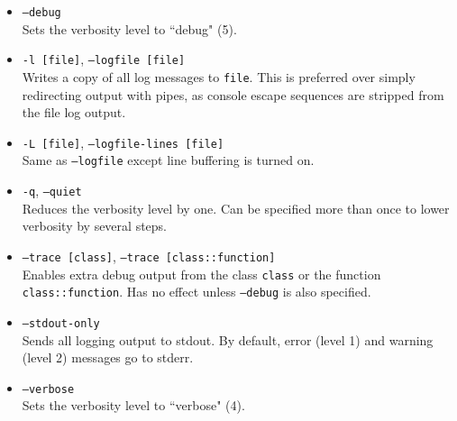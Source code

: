 \begin{itemize}

\item \texttt{--debug}\\
Sets the verbosity level to ``debug" (5).

\item \texttt{-l [file]}, \texttt{--logfile [file]}\\
Writes a copy of all log messages to \texttt{file}. This is preferred over simply redirecting output with pipes, as
console escape sequences are stripped from the file log output.

\item \texttt{-L [file]}, \texttt{--logfile-lines [file]}\\
Same as \texttt{--logfile} except line buffering is turned on.

\item \texttt{-q}, \texttt{--quiet}\\
Reduces the verbosity level by one. Can be specified more than once to lower verbosity by several steps.

\item \texttt{--trace [class]}, \texttt{--trace [class::function]} \\
Enables extra debug output from the class \texttt{class} or the function \texttt{class::function}. Has no effect unless
\texttt{--debug} is also specified.

\item \texttt{--stdout-only}\\
Sends all logging output to stdout. By default, error (level 1) and warning (level 2) messages go to stderr.

\item \texttt{--verbose}\\
Sets the verbosity level to ``verbose" (4).

\end{itemize}

